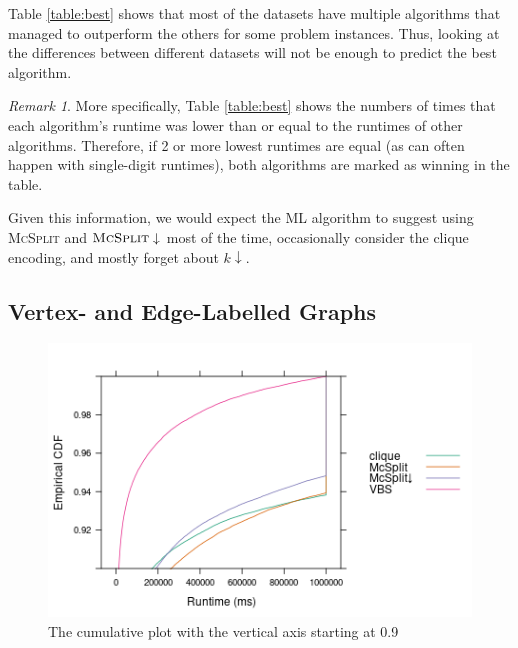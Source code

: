 \documentclass{l4proj}
\theoremstyle{definition}
\theoremstyle{remark}
\newtheorem{remark}{Remark}[chapter]
\begin{document}
Table \ref{table:best} shows that most of the datasets have multiple algorithms
that managed to outperform the others for some problem instances. Thus, looking
at the differences between different datasets will not be enough to predict the
best algorithm.

\begin{remark}
  More specifically, Table \ref{table:best} shows the numbers of times that each
  algorithm's runtime was lower than or equal to the runtimes of other algorithms.
  Therefore, if 2 or more lowest runtimes are equal (as can often happen with
  single-digit runtimes), both algorithms are marked as winning in the table.
\end{remark}

Given this information, we would expect the ML algorithm to suggest using
\textsc{McSplit} and $\textsc{McSplit}\downarrow$ most of the time, occasionally
consider the clique encoding, and mostly forget about $k\downarrow$.

\subsection{Vertex- and Edge-Labelled Graphs} \label{sec:runtime_both}

\begin{figure}
  \centering
  \includegraphics[scale=0.7]{images/ecdf_both_labels.png}
  \caption{The cumulative plot with the vertical axis starting at 0.9}
  \label{fig:ecdf_both_labels}
\end{figure}
\end{document}
